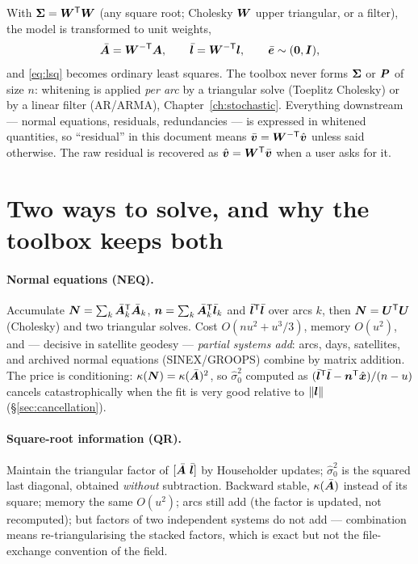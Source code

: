 With $\bm{\Sigma} = \bm{W}^{\mathsf T}\bm{W}$ (any square root; Cholesky $\bm{W}$ upper triangular, or a filter), the model is transformed to unit weights,
\begin{equation}
\bar{\bm{A}} = \bm{W}^{-\mathsf T}\bm{A}, \qquad \bar{\bm{l}} = \bm{W}^{-\mathsf T}\bm{l}, \qquad \bar{\bm{e}} \sim (\bm{0}, \bm{I}),
\label{eq:whiten}
\end{equation}
and \eqref{eq:lsq} becomes ordinary least squares. The toolbox never forms $\bm{\Sigma}$ or $\bm{P}$ of size $n$: whitening is applied \emph{per arc} by a triangular solve (Toeplitz Cholesky) or by a linear filter (AR/ARMA), Chapter~\ref{ch:stochastic}. Everything downstream --- normal equations, residuals, redundancies --- is expressed in whitened quantities, so ``residual'' in this document means $\bar{\bm{v}} = \bm{W}^{-\mathsf T}\hat{\bm{v}}$ unless said otherwise. The raw residual is recovered as $\hat{\bm{v}} = \bm{W}^{\mathsf T}\bar{\bm{v}}$ when a user asks for it.

\section{Two ways to solve, and why the toolbox keeps both}
\label{sec:twosolvers}

\paragraph{Normal equations (NEQ).} Accumulate $\bm{N} = \sum_k \bar{\bm{A}}_k^{\mathsf T}\bar{\bm{A}}_k$, $\bm{n} = \sum_k\bar{\bm{A}}_k^{\mathsf T}\bar{\bm{l}}_k$ and $\bar{\bm{l}}^{\mathsf T}\bar{\bm{l}}$ over arcs $k$, then $\bm{N} = \bm{U}^{\mathsf T}\bm{U}$ (Cholesky) and two triangular solves. Cost $O(n u^2 + u^3/3)$, memory $O(u^2)$, and --- decisive in satellite geodesy --- \emph{partial systems add}: arcs, days, satellites, and archived normal equations (SINEX/GROOPS) combine by matrix addition. The price is conditioning: $\kappa(\bm{N}) = \kappa(\bar{\bm{A}})^2$, so $\hat\sigma_0^2$ computed as $(\bar{\bm{l}}^{\mathsf T}\bar{\bm{l}} - \bm{n}^{\mathsf T}\hat{\bm{x}})/(n-u)$ cancels catastrophically when the fit is very good relative to $\|\bm{l}\|$ (\S\ref{sec:cancellation}).

\paragraph{Square-root information (QR).} Maintain the triangular factor of $[\bar{\bm{A}}\ \bar{\bm{l}}]$ by Householder updates; $\hat\sigma_0^2$ is the squared last diagonal, obtained \emph{without} subtraction. Backward stable, $\kappa(\bar{\bm{A}})$ instead of its square; memory the same $O(u^2)$; arcs still add (the factor is updated, not recomputed); but factors of two independent systems do not add --- combination means re-triangularising the stacked factors, which is exact but not the file-exchange convention of the field.

